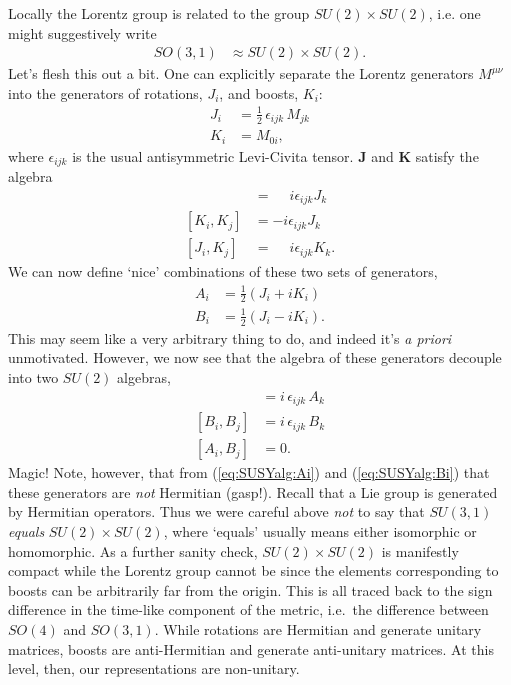 Locally the Lorentz group is related to the group $SU(2)\times SU(2)$, i.e. one might suggestively write
\begin{align}
    SO(3,1) &\approx SU(2)\times SU(2).
\end{align}
Let's flesh this out a bit. One can explicitly separate the Lorentz generators $M^{\mu\nu}$ into the generators of rotations, $J_i$, and boosts, $K_i$:
\begin{align}
    J_i &= \frac 12 \,\epsilon_{ijk}\,M_{jk}\label{eq:Poincar\'e:J}\\
    K_i &= M_{0i},\label{eq:Poincar\'e:K}
\end{align}
where $\epsilon_{ijk}$ is the usual antisymmetric Levi-Civita tensor. 
$\mathbf J$ and $\mathbf K$ satisfy the algebra
\begin{align}
    [J_i, J_j] &= \phantom+ i\epsilon_{ijk}J_k\label{eq:SUSYalg:JJ}\\
    [K_i, K_j] &= -i\epsilon_{ijk}J_k\label{eq:SUSYalg:KK}\\
    [J_i, K_j] &= \phantom+ i\epsilon_{ijk}K_k.\label{eq:SUSYalg:JK}
\end{align}
We can now define `nice' combinations of these two sets of generators,
\begin{align}
    A_i &= \frac 12 (J_i + iK_i)\label{eq:SUSYalg:Ai}\\
    B_i &= \frac 12 (J_i - iK_i)\label{eq:SUSYalg:Bi}.
\end{align}
This may seem like a very arbitrary thing to do, and indeed it's \textit{a priori} unmotivated. However, we now see that the algebra of these generators decouple into two $SU(2)$ algebras,
\begin{align}
    [A_i,A_j] &= i\,\epsilon_{ijk}\, A_k\\
    [B_i,B_j] &= i\,\epsilon_{ijk}\, B_k\\
    [A_i,B_j] &= 0.
\end{align}
Magic! %
Note, however, that from  (\ref{eq:SUSYalg:Ai}) and (\ref{eq:SUSYalg:Bi}) that these generators are \emph{not} Hermitian (gasp!). 
Recall that a Lie group is generated by Hermitian operators. Thus we were careful above \emph{not} to say that $SU(3,1)$ \textit{equals} $SU(2)\times SU(2)$, where `equals' usually means either isomorphic or homomorphic. As a further sanity check, $SU(2)\times SU(2)$ is manifestly compact while the Lorentz group cannot be since the elements corresponding to boosts can be arbitrarily far from the origin.
%
This is all traced back to the sign difference in the time-like component of the metric, i.e.\ the difference between $SO(4)$ and $SO(3,1)$. While rotations are Hermitian and generate unitary matrices, boosts are anti-Hermitian and generate anti-unitary matrices. At this level, then, our representations are non-unitary.

